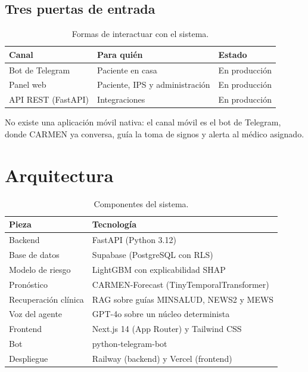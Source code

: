 \documentclass[11pt,a4paper]{article}
\begin{document}
\subsection*{Tres puertas de entrada}

\begin{table}[htbp]\centering
\begin{tabular}{@{}lll@{}}
\toprule
\textbf{Canal} & \textbf{Para quién} & \textbf{Estado} \\
\midrule
Bot de Telegram & Paciente en casa & En producción \\
Panel web & Paciente, IPS y administración & En producción \\
API REST (FastAPI) & Integraciones & En producción \\
\bottomrule
\end{tabular}
\caption{Formas de interactuar con el sistema.}
\end{table}

No existe una aplicación móvil nativa: el canal móvil es el bot de Telegram,
donde CARMEN ya conversa, guía la toma de signos y alerta al médico asignado.

\newpage
\section{Arquitectura}

\begin{table}[htbp]\centering
\begin{tabular}{@{}ll@{}}
\toprule
\textbf{Pieza} & \textbf{Tecnología} \\
\midrule
Backend & FastAPI (Python 3.12) \\
Base de datos & Supabase (PostgreSQL con RLS) \\
Modelo de riesgo & LightGBM con explicabilidad SHAP \\
Pronóstico & CARMEN-Forecast (TinyTemporalTransformer) \\
Recuperación clínica & RAG sobre guías MINSALUD, NEWS2 y MEWS \\
Voz del agente & GPT-4o sobre un núcleo determinista \\
Frontend & Next.js 14 (App Router) y Tailwind CSS \\
Bot & python-telegram-bot \\
Despliegue & Railway (backend) y Vercel (frontend) \\
\bottomrule
\end{tabular}
\caption{Componentes del sistema.}
\end{table}
\end{document}
